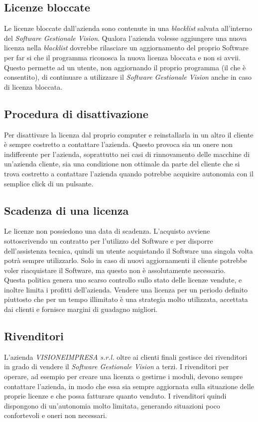 \subsection{Licenze bloccate} 

Le licenze bloccate dall'azienda sono contenute in una \textit{blacklist} salvata all’interno del \textit{Software Gestionale Vision}. Qualora l'azienda volesse aggiungere una nuova licenza nella \textit{blacklist} dovrebbe rilasciare un aggiornamento del proprio Software per far si che il programma riconosca la nuova licenza bloccata e non si avvii.
\\Questo permette ad un utente, non aggiornando il proprio programma (il che è consentito), di continuare a utilizzare il \textit{Software Gestionale Vision} anche in caso di licenza bloccata. 

\subsection{Procedura di disattivazione} 
Per disattivare la licenza dal proprio computer e reinstallarla in un altro il cliente è sempre costretto a contattare l'azienda. Questo provoca sia un onere non indifferente per l'azienda, soprattutto nei casi di rinnovamento delle macchine di un'azienda cliente, sia una condizione non ottimale da parte del cliente che si trova costretto a contattare l'azienda quando potrebbe acquisire autonomia con il semplice click di un pulsante.

\subsection{Scadenza di una licenza} 
Le licenze non possiedono una data di scadenza. L'acquisto avviene sottoscrivendo un contratto per l'utilizzo del Software e per disporre dell'assistenza tecnica, quindi un utente acquistando il Software una singola volta potrà sempre utilizzarlo. Solo in caso di nuovi aggiornamenti il cliente potrebbe voler riacquistare il Software, ma questo non è assolutamente necessario. 
\\Questa politica genera uno scarso controllo sullo stato delle licenze vendute, e inoltre limita i profitti dell'azienda. Vendere una licenza per un periodo definito piuttosto che per un tempo illimitato è una strategia molto utilizzata, accettata dai clienti e fornisce margini di guadagno migliori.

\subsection{Rivenditori} 
L'azienda \textit{VISIONEIMPRESA s.r.l.} oltre ai clienti finali gestisce dei rivenditori in grado di vendere il \textit{Software Gestionale Vision} a terzi. 
I rivenditori per operare, ad esempio per creare una licenza o gestirne i moduli, devono sempre contattare l'azienda, in modo che essa sia sempre aggiornata sulla situazione delle proprie licenze e che possa fatturare quanto venduto. I rivenditori quindi dispongono di un'autonomia molto limitata, generando situazioni poco confortevoli e oneri non necessari.

